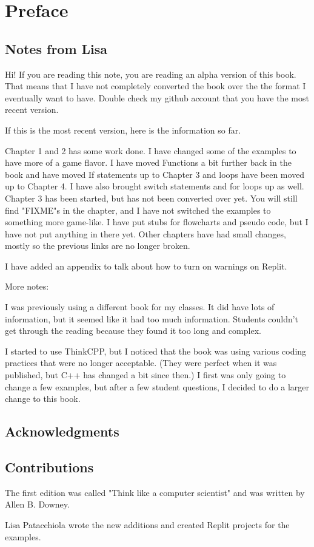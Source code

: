 
\chapter{Preface}

\section{Notes from Lisa}
Hi! If you are reading this note, you are reading an alpha version of this book. That means that I have not completely converted the book over the the format I eventually want to have. Double check my github account that you have the most recent version.

If this is the most recent version, here is the information so far.

Chapter 1 and 2 has some work done. I have changed some of the examples to have more of a game flavor. I have moved Functions a bit further back in the book and have moved If statements up to Chapter 3 and loops have been moved up to Chapter 4. I have also brought switch statements and for loops up as well. Chapter 3 has been started, but has not been converted over yet. You will still find "FIXME"s in the chapter, and I have not switched the examples to something more game-like. I have put stubs for flowcharts and pseudo code, but I have not put anything in there yet. Other chapters have had small changes, mostly so the previous links are no longer broken.

I have added an appendix to talk about how to turn on warnings on Replit.


More notes:

I was previously using a different book for my classes. It did have lots of information, but it seemed like it had too much information. Students couldn't get through the reading because they found it too long and complex.

I started to use ThinkCPP, but I noticed that the book was using various coding practices that were no longer acceptable. (They were perfect when it was published, but C++ has changed a bit since then.) I first was only going to change a few examples, but after a few student questions, I decided to do a larger change to this book.


\section{Acknowledgments}

\section{Contributions}
The first edition was called "Think like a computer scientist" and was written by Allen B. Downey. 

Lisa Patacchiola wrote the new additions and created Replit projects for the examples. 


